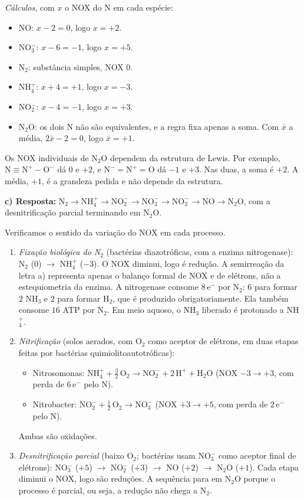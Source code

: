 \documentclass{article}%
\begin{document}
\emph{Cálculos}, com $x$ o NOX do N em cada espécie:
\begin{itemize}
\item NO: $x-2=0$, logo $x=+2$.
\item NO$_3^-$: $x-6=-1$, logo $x=+5$.
\item N$_2$: substância simples, NOX $0$.
\item NH$_4^+$: $x+4=+1$, logo $x=-3$.
\item NO$_2^-$: $x-4=-1$, logo $x=+3$.
\item N$_2$O: os dois N não são equivalentes, e a regra fixa apenas a soma. Com $\bar{x}$ a média, $2\bar{x}-2=0$, logo $\bar{x}=+1$.
\end{itemize}
Os NOX individuais de N$_2$O dependem da estrutura de Lewis. Por exemplo, $\mathrm{N\equiv N^{+}-O^{-}}$ dá $0$ e $+2$, e $\mathrm{N^{-}=N^{+}=O}$ dá $-1$ e $+3$. Nas duas, a soma é $+2$. A média, $+1$, é a grandeza pedida e não depende da estrutura.

\textbf{c) Resposta:} $\mathrm{N_2 \rightarrow NH_4^{+} \rightarrow NO_2^{-} \rightarrow NO_3^{-} \rightarrow NO_2^{-} \rightarrow NO \rightarrow N_2O}$, com a desnitrificação parcial terminando em N$_2$O.

Verificamos o sentido da variação do NOX em cada processo.
\begin{enumerate}
\item \emph{Fixação biológica do N$_2$} (bactérias diazotróficas, com a enzima nitrogenase): N$_2$ ($0$) $\rightarrow$ NH$_4^+$ ($-3$). O NOX diminui, logo é redução. A semirreação da letra a) representa apenas o balanço formal de NOX e de elétrons, não a estequiometria da enzima. A nitrogenase consome $8\,\mathrm{e^-}$ por N$_2$: $6$ para formar $2$ NH$_3$ e $2$ para formar H$_2$, que é produzido obrigatoriamente. Ela também consome $16$ ATP por N$_2$. Em meio aquoso, o NH$_3$ liberado é protonado a NH$_4^+$.
\item \emph{Nitrificação} (solos aerados, com O$_2$ como aceptor de elétrons, em duas etapas feitas por bactérias quimiolitoautotróficas):
\begin{itemize}
\item Nitrosomonas: $\mathrm{NH_4^{+} + \tfrac{3}{2}\,O_2 \longrightarrow NO_2^{-} + 2\,H^{+} + H_2O}$ (NOX $-3 \rightarrow +3$, com perda de $6\,\mathrm{e^-}$ pelo N).
\item Nitrobacter: $\mathrm{NO_2^{-} + \tfrac{1}{2}\,O_2 \longrightarrow NO_3^{-}}$ (NOX $+3 \rightarrow +5$, com perda de $2\,\mathrm{e^-}$ pelo N).
\end{itemize}
Ambas são oxidações.
\item \emph{Desnitrificação parcial} (baixo O$_2$; bactérias usam NO$_3^-$ como aceptor final de elétrons): NO$_3^-$ ($+5$) $\rightarrow$ NO$_2^-$ ($+3$) $\rightarrow$ NO ($+2$) $\rightarrow$ N$_2$O ($+1$). Cada etapa diminui o NOX, logo são reduções. A sequência para em N$_2$O porque o processo é parcial, ou seja, a redução não chega a N$_2$.
\end{enumerate}
\end{document}

